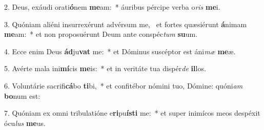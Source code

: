 2. Deus, exáudi orati\textbf{ó}nem \textbf{me}am:~*  áuribus pércipe verba o\textit{ris} \textbf{me}i.\

3. Quóniam aliéni insurrexérunt advérsum me, \dag\  et fortes quæsiérunt \textbf{á}nimam \textbf{me}am:~*  et non proposuérunt Deum ante conspéc\textit{tum} \textbf{su}um.\

4. Ecce enim Deus \textbf{ád}ju\textbf{vat} me:~*  et Dóminus suscéptor est áni\textit{mæ} \textbf{me}æ.\

5. Avérte mala ini\textbf{mí}cis \textbf{me}is:~*  et in veritáte tua dispér\textit{de} \textbf{il}los.\

6. Voluntárie sacrifi\textbf{cá}bo \textbf{ti}bi,~*  et confitébor nómini tuo, Dómine: quóni\textit{am} \textbf{bo}num est:\

7. Quóniam ex omni tribulatióne e\textbf{ri}pu\textbf{ís}\textbf{ti} me:~*  et super inimícos meos despéxit ócu\textit{lus} \textbf{me}us.\

